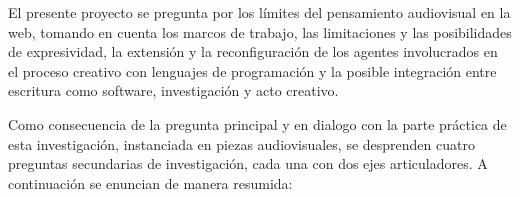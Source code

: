 


El presente proyecto se pregunta por los límites del pensamiento audiovisual en la web, tomando en cuenta los marcos de trabajo, las limitaciones y las posibilidades de expresividad, la extensión y la reconfiguración de los agentes involucrados en el proceso creativo con lenguajes de programación y la posible integración entre escritura como software, investigación y acto creativo.




Como consecuencia de la pregunta principal y en dialogo con la parte práctica de esta investigación, instanciada en piezas audiovisuales, se desprenden cuatro preguntas secundarias de investigación, cada una con dos ejes articuladores. A continuación se enuncian de manera resumida: 


